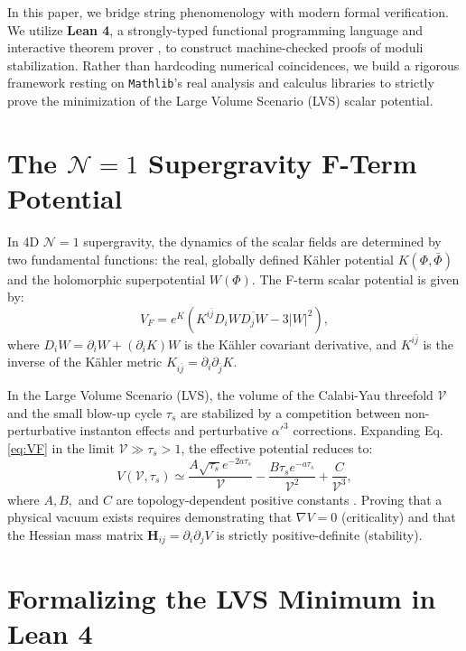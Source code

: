 \documentclass[aps,prd,twocolumn,nofootinbib,superscriptaddress,10pt]{revtex4-2}
\begin{document}
In this paper, we bridge string phenomenology with modern formal verification. We utilize \textbf{Lean 4}, a strongly-typed functional programming language and interactive theorem prover \cite{Moura2021}, to construct machine-checked proofs of moduli stabilization. Rather than hardcoding numerical coincidences, we build a rigorous framework resting on \texttt{Mathlib}'s real analysis and calculus libraries to strictly prove the minimization of the Large Volume Scenario (LVS) scalar potential.

\section{The $\mathcal{N}=1$ Supergravity F-Term Potential}

In 4D $\mathcal{N}=1$ supergravity, the dynamics of the scalar fields are determined by two fundamental functions: the real, globally defined Kähler potential $K(\Phi, \bar{\Phi})$ and the holomorphic superpotential $W(\Phi)$. The F-term scalar potential is given by:
\begin{equation}
    V_F = e^K \left( K^{i\bar{j}} D_i W \overline{D_j W} - 3|W|^2 \right),
    \label{eq:VF}
\end{equation}
where $D_i W = \partial_i W + (\partial_i K)W$ is the Kähler covariant derivative, and $K^{i\bar{j}}$ is the inverse of the Kähler metric $K_{i\bar{j}} = \partial_i \partial_{\bar{j}} K$.

In the Large Volume Scenario (LVS), the volume of the Calabi-Yau threefold $\mathcal{V}$ and the small blow-up cycle $\tau_s$ are stabilized by a competition between non-perturbative instanton effects and perturbative $\alpha'^3$ corrections. Expanding Eq.\,\eqref{eq:VF} in the limit $\mathcal{V} \gg \tau_s > 1$, the effective potential reduces to:
\begin{equation}
    V(\mathcal{V}, \tau_s) \simeq \frac{A \sqrt{\tau_s} e^{-2 a \tau_s}}{\mathcal{V}} - \frac{B \tau_s e^{-a \tau_s}}{\mathcal{V}^2} + \frac{C}{\mathcal{V}^3},
    \label{eq:LVS_simplified}
\end{equation}
where $A, B,$ and $C$ are topology-dependent positive constants \cite{Balasubramanian2005}. Proving that a physical vacuum exists requires demonstrating that $\nabla V = 0$ (criticality) and that the Hessian mass matrix $\mathbf{H}_{ij} = \partial_i \partial_j V$ is strictly positive-definite (stability).

\section{Formalizing the LVS Minimum in Lean 4}
\end{document}
